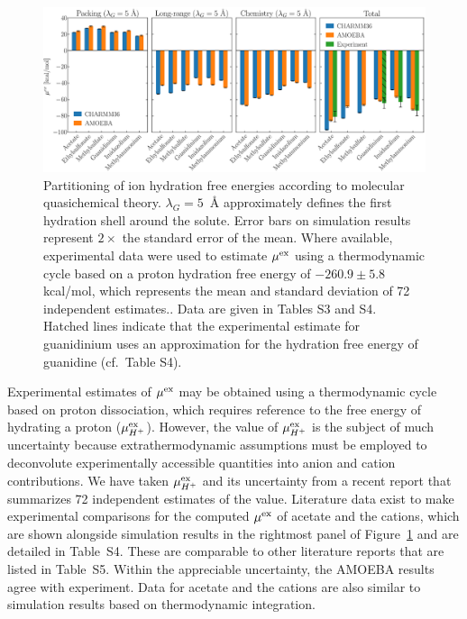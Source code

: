 \documentclass[journal=jpclcd,manuscript=article,articletitle=true,layout=twocolumn]{achemso}
\begin{document}
\begin{figure}[ht]
    \begin{center}
        \includegraphics[width=\textwidth]{final_images/Figure4.eps}
        \caption{Partitioning of ion hydration free energies according to molecular quasichemical theory. $\lambda_G = 5$~{\AA} approximately defines the first hydration shell around the solute. Error bars on simulation results represent $2\times$ the standard error of the mean. Where available, experimental data were used to estimate $\mu^{\rm{ex}}$ using a thermodynamic cycle based on a proton hydration free energy of $-260.9 \pm 5.8$ kcal/mol, which represents the mean and standard deviation of 72 independent estimates.\cite{Fossat2021}. Data are given in Tables S3 and S4. Hatched lines indicate that the experimental estimate for guanidinium uses an approximation for the hydration free energy of guanidine (cf.~Table S4).} 
        \label{fig:mqct}
    \end{center}
\end{figure}
 

Experimental estimates of $\mu^{\rm{ex}}$ may be obtained using a thermodynamic cycle based on proton dissociation, which requires reference to the free energy of hydrating a proton ($\mu^{\rm{ex}}_{H^+}$).\cite{Fossat2021, Lim1991, Pearson1986} However, the value of $\mu^{\rm{ex}}_{H^+}$ is the subject of much uncertainty because extrathermodynamic assumptions must be employed to deconvolute experimentally accessible quantities into anion and cation contributions.\cite{Grossfield2003, Zhang2017, Fossat2021} We have taken $\mu^{\rm{ex}}_{H^+}$ and its uncertainty from a recent report that summarizes 72 independent estimates of the value.\cite{Fossat2021} Literature data exist to make experimental comparisons for the computed $\mu^{\rm{ex}}$ of acetate and the cations,\cite{Cramer1991, Taft1987, Cumming1977, Fujio1981, Settimo2014, Zhang2017, Wolfenden1981, Reif2012, Hunter1998, Rizzo2006, In2005} which are shown alongside simulation results in the rightmost panel of Figure~\ref{fig:mqct} and are detailed in Table~S4. These are comparable to other literature reports that are listed in Table~S5.\cite{Pearson1986, Cramer1991, Gilson1988, Marcus2013, Gokcen2014} Within the appreciable uncertainty, the AMOEBA results agree with experiment. Data for acetate and the cations are also similar to simulation results based on thermodynamic integration.\cite{Lin2018, Fossat2021, Zhang2017}   
\end{document}
